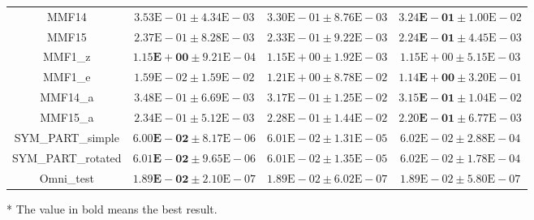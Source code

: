 \begin{table}[htbp]
\begin{tabular}{cccc}
		MMF14 & $3.53\text{E}-01 \pm 4.34\text{E}-03$ & $3.30\text{E}-01 \pm 8.76\text{E}-03$ & $\mathbf{3.24\text{E}-01} \pm 1.00\text{E}-02$\\
		MMF15 & $2.37\text{E}-01 \pm 8.28\text{E}-03$ & $2.33\text{E}-01 \pm 9.22\text{E}-03$ & $\mathbf{2.24\text{E}-01} \pm 4.45\text{E}-03$\\
		MMF1\_z & $\mathbf{1.15\text{E}+00} \pm 9.21\text{E}-04$ & $1.15\text{E}+00 \pm 1.92\text{E}-03$ & $1.15\text{E}+00 \pm 5.15\text{E}-03$\\
		MMF1\_e & $1.59\text{E}-02 \pm 1.59\text{E}-02$ & $1.21\text{E}+00 \pm 8.78\text{E}-02$ & $\mathbf{1.14\text{E}+00} \pm 3.20\text{E}-01$\\
		MMF14\_a & $3.48\text{E}-01 \pm 6.69\text{E}-03$ & $3.17\text{E}-01 \pm 1.25\text{E}-02$ & $\mathbf{3.15\text{E}-01} \pm 1.04\text{E}-02$\\
		MMF15\_a & $2.34\text{E}-01 \pm 5.12\text{E}-03$ & $2.28\text{E}-01 \pm 1.44\text{E}-02$ & $\mathbf{2.20\text{E}-01} \pm 6.77\text{E}-03$\\
		SYM\_PART\_simple & $\mathbf{6.00\text{E}-02} \pm 8.17\text{E}-06$ & $6.01\text{E}-02 \pm 1.31\text{E}-05$ & $6.02\text{E}-02 \pm 2.88\text{E}-04$\\
		SYM\_PART\_rotated & $\mathbf{6.01\text{E}-02} \pm 9.65\text{E}-06$ & $6.01\text{E}-02 \pm 1.35\text{E}-05$ & $6.02\text{E}-02 \pm 1.78\text{E}-04$\\
		Omni\_test & $\mathbf{1.89\text{E}-02} \pm 2.10\text{E}-07$ & $1.89\text{E}-02 \pm 6.02\text{E}-07$ & $1.89\text{E}-02 \pm 5.80\text{E}-07$\\
		\bottomrule
	\end{tabular}
	\begin{tablenotes}
		\item[*] The value in bold means the best result.
	\end{tablenotes}
\end{table}
\renewcommand\arraystretch{0.9}
